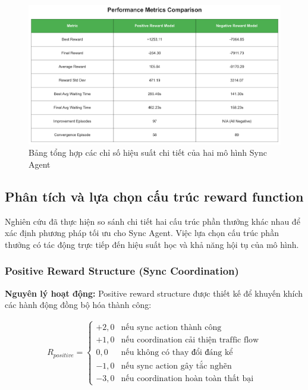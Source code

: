 \begin{figure}[!htp]
    \centering
    \includegraphics[width=\textwidth]{figures/sync_performance_metrics.png}
    \caption{Bảng tổng hợp các chỉ số hiệu suất chi tiết của hai mô hình Sync Agent}
    \label{fig:sync_performance_metrics}
\end{figure}


\subsection{Phân tích và lựa chọn cấu trúc reward function}

Nghiên cứu đã thực hiện so sánh chi tiết hai cấu trúc phần thưởng khác nhau để xác định phương pháp tối ưu cho Sync Agent. Việc lựa chọn cấu trúc phần thưởng có tác động trực tiếp đến hiệu suất học và khả năng hội tụ của mô hình.

\subsubsection{Positive Reward Structure (Sync Coordination)}

\textbf{Nguyên lý hoạt động:} Positive reward structure được thiết kế để khuyến khích
các hành động đồng bộ hóa thành công:

\begin{align}
    R_{positive}= \begin{cases}+2,0&\text{nếu sync action thành công}\\ +1,0&\text{nếu coordination cải thiện traffic flow}\\ 0,0&\text{nếu không có thay đổi đáng kể}\\ -1,0&\text{nếu sync action gây tắc nghẽn}\\ -3,0&\text{nếu coordination hoàn toàn thất bại}\end{cases}
\end{align}

